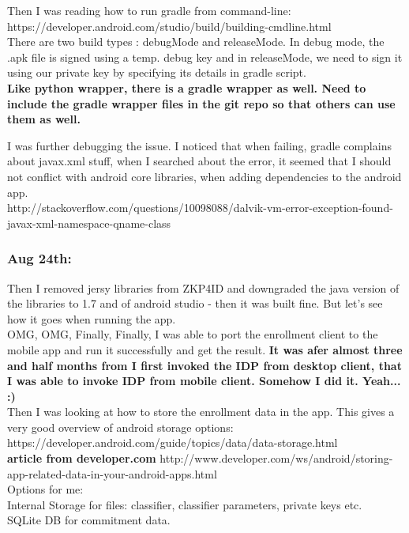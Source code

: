 \documentclass[11pt]{article}
\begin{document}
Then I was reading how to run gradle from command-line: https://developer.android.com/studio/build/building-cmdline.html\\
There are two build types : debugMode and releaseMode. In debug mode, the .apk file is signed using a temp. debug key and in releaseMode, we need to 
sign it using our private key by specifying its details in gradle script.\\

\textbf{Like python wrapper, there is a gradle wrapper as well. Need to include the gradle wrapper files in the git repo so that others can use them 
as well.}

I was further debugging the issue. I noticed that when failing, gradle complains about javax.xml stuff, when I searched about the error, it seemed 
that I should not conflict with android core libraries, when adding dependencies to the android app.\\
http://stackoverflow.com/questions/10098088/dalvik-vm-error-exception-found-javax-xml-namespace-qname-class\\

\subsubsection*{Aug 24th:}
Then I removed jersy libraries from ZKP4ID and downgraded the java version of the libraries to 1.7 and of android studio - then it was built fine. 
But let's see how it goes when running the app.\\

OMG, OMG, Finally, Finally, I was able to port the enrollment client to the mobile app and run it successfully and get the result.
\textbf{It was afer almost three and half months from I first invoked the IDP from desktop client, that I was able to invoke IDP from mobile client. 
Somehow I did it. Yeah... :)}\\

Then I was looking at how to store the enrollment data in the app. This gives a very good overview of android storage options: 
https://developer.android.com/guide/topics/data/data-storage.html\\
\textbf{article from developer.com} http://www.developer.com/ws/android/storing-app-related-data-in-your-android-apps.html\\

Options for me:\\
Internal Storage for files: classifier, classifier parameters, private keys etc.\\
SQLite DB for commitment data.\\
\end{document}
